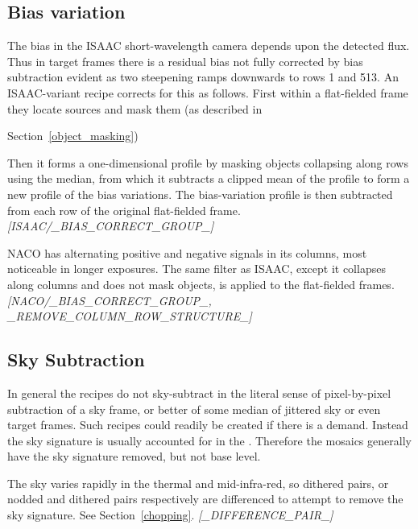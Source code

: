 \documentclass[twoside,11pt,nolof]{starlink}
\begin{document}
\subsection{Bias variation\label{bias_variation}}

The bias in the ISAAC short-wavelength camera depends upon the detected
flux.  Thus in target frames there is a residual bias not fully
corrected by bias subtraction evident as two steepening ramps
downwards to rows 1 and 513.  An ISAAC-variant recipe corrects for this
as follows.  First within a flat-fielded frame they locate sources and
mask them (as described in
\begin{latexonly}
Section~\ref{object_masking})
\end{latexonly}


Then it forms a one-dimensional profile by masking objects collapsing
along rows using the median, from which it subtracts a clipped mean of
the profile to form a new profile of the bias variations. The
bias-variation profile is then subtracted from each row of the
original flat-fielded frame.
\newline \emph{[ISAAC/\_BIAS\_CORRECT\_GROUP\_]}

NACO has alternating positive and negative signals in its columns,
most noticeable in longer exposures.  The same filter as ISAAC, except
it collapses along columns and does not mask objects, is applied to
the flat-fielded frames.
\newline \emph{[NACO/\_BIAS\_CORRECT\_GROUP\_, \_REMOVE\_COLUMN\_ROW\_STRUCTURE\_]}

\subsection{Sky Subtraction\label{sky_subtraction}}

In general the recipes do not sky-subtract in the literal sense of
pixel-by-pixel subtraction of a sky frame, or better of some median of
jittered sky or even target frames.  Such recipes could readily be
created if there is a demand.  Instead the sky signature is usually
accounted for in the .
Therefore the mosaics generally have the sky signature removed, but
not base level.

The sky varies rapidly in the thermal and mid-infra-red, so dithered
pairs, or nodded and dithered pairs respectively are differenced to
attempt to remove the sky signature.  See Section~\ref{chopping}.
\newline\emph{[\_DIFFERENCE\_PAIR\_]}
\end{document}
